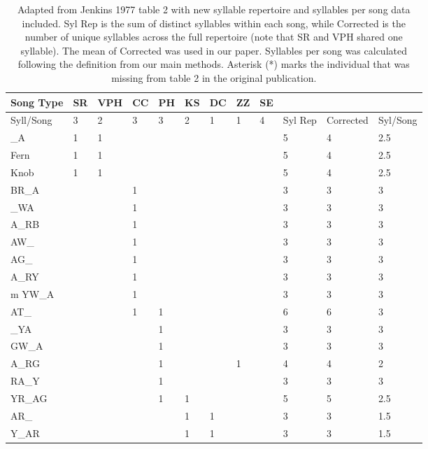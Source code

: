 \documentclass[a4paper,12pt]{article}
\begin{document}
\begin{table}[ht]
\caption{Adapted from Jenkins 1977 table 2 with new syllable repertoire and syllables per song data included. Syl Rep is the sum of distinct syllables within each song, while Corrected is the number of unique syllables across the full repertoire (note that SR and VPH shared one syllable). The mean of Corrected was used in our paper. Syllables per song was calculated following the definition from our main methods. Asterisk (*) marks the individual that was missing from table 2 in the original publication.}
\centering

\begin{tabular}{|l|llllllll|lll|}
  \hline
Song Type & SR & VPH & CC & PH & KS & DC & ZZ & SE &  &  &  \\ 
  \hline
Syll/Song & 3 & 2 & 3 & 3 & 2 & 1 & 1 & 4 & Syl Rep & Corrected & Syl/Song \\ 
\hline
\hline
  \_A & 1 & 1 &  &  &  &  &  &  & 5 & 4 & 2.5 \\ 
  Fern & 1 & 1 &  &  &  &  &  &  & 5 & 4 & 2.5 \\ 
  Knob & 1 & 1 &  &  &  &  &  &  & 5 & 4 & 2.5 \\ 
  BR\_A &  &  & 1 &  &  &  &  &  & 3 & 3 & 3 \\ 
  \_WA &  &  & 1 &  &  &  &  &  & 3 & 3 & 3 \\ 
  A\_RB &  &  & 1 &  &  &  &  &  & 3 & 3 & 3 \\ 
  AW\_ &  &  & 1 &  &  &  &  &  & 3 & 3 & 3 \\ 
  AG\_ &  &  & 1 &  &  &  &  &  & 3 & 3 & 3 \\ 
  A\_RY &  &  & 1 &  &  &  &  &  & 3 & 3 & 3 \\ 
  m YW\_A &  &  & 1 &  &  &  &  &  & 3 & 3 & 3 \\ 
  AT\_ &  &  & 1 & 1 &  &  &  &  & 6 & 6 & 3 \\ 
  \_YA &  &  &  & 1 &  &  &  &  & 3 & 3 & 3 \\ 
  GW\_A &  &  &  & 1 &  &  &  &  & 3 & 3 & 3 \\ 
  A\_RG &  &  &  & 1 &  &  & 1 &  & 4 & 4 & 2 \\ 
  RA\_Y &  &  &  & 1 &  &  &  &  & 3 & 3 & 3 \\ 
  YR\_AG &  &  &  & 1 & 1 &  &  &  & 5 & 5 & 2.5 \\ 
  AR\_ &  &  &  &  & 1 & 1 &  &  & 3 & 3 & 1.5 \\ 
  Y\_AR &  &  &  &  & 1 & 1 &  &  & 3 & 3 & 1.5 \\ 

\end{tabular}
\end{table}
\end{document}

